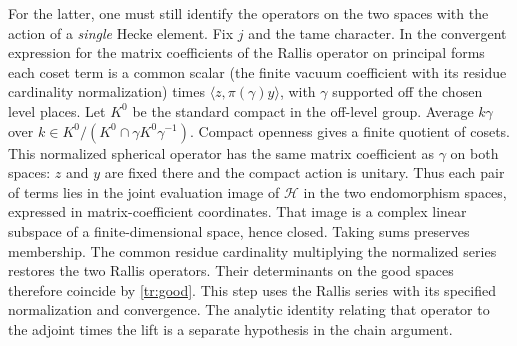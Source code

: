 For the latter, one must still identify the operators on the two
spaces with the action of a \emph{single} Hecke element. Fix $j$ and
the tame character. In the convergent expression for the matrix
coefficients of the Rallis operator on principal forms each coset term
is a common scalar (the finite vacuum coefficient with its residue
cardinality normalization) times $\langle z,\pi(\gamma)y\rangle$,
with $\gamma$ supported off the chosen level places. Let $K^0$ be the
standard compact in the off-level group. Average $k\gamma$ over
$k\in K^0/(K^0\cap\gamma K^0\gamma^{-1})$. Compact openness gives a
finite quotient of cosets. This normalized spherical operator has the
same matrix coefficient as $\gamma$ on both spaces: $z$ and $y$ are
fixed there and the compact action is unitary. Thus each pair of
terms lies in the joint evaluation image of $\mathcal H$ in the two
endomorphism spaces, expressed in matrix-coefficient coordinates. That
image is a complex linear subspace of a finite-dimensional space, hence
closed. Taking sums preserves membership. The common residue cardinality
multiplying the normalized series restores the two Rallis operators.
Their determinants on the good spaces therefore coincide by
\eqref{tr:good}. This step uses the Rallis series with its specified
normalization and convergence. The analytic identity relating that
operator to the adjoint times the lift is a separate hypothesis in the
chain argument.



